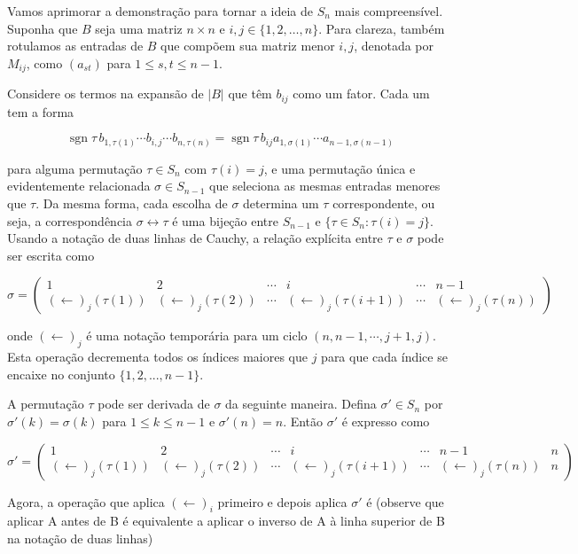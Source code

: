 Vamos aprimorar a demonstração para tornar a ideia de $S_n$ mais compreensível. Suponha que $B$ seja uma matriz $n \times n$ e $i,j \in \{1,2,\dots ,n\}$. Para clareza, também rotulamos as entradas de $B$ que compõem sua matriz menor $i,j$, denotada por $M_{ij}$, como $(a_{st})$ para $1 \leq s,t \leq n-1$.

Considere os termos na expansão de $|B|$ que têm $b_{ij}$ como um fator. Cada um tem a forma

$$\operatorname{sgn} \tau \, b_{1,\tau (1)}\cdots b_{i,j}\cdots b_{n,\tau (n)} = \operatorname{sgn} \tau \, b_{ij} a_{1,\sigma (1)}\cdots a_{n-1,\sigma (n-1)}$$

para alguma permutação $\tau \in S_n$ com $\tau (i) = j$, e uma permutação única e evidentemente relacionada $\sigma \in S_{n-1}$ que seleciona as mesmas entradas menores que $\tau$. Da mesma forma, cada escolha de $\sigma$ determina um $\tau$ correspondente, ou seja, a correspondência $\sigma \leftrightarrow \tau$ é uma bijeção entre $S_{n-1}$ e $\{\tau \in S_{n}: \tau (i) = j\}$. Usando a notação de duas linhas de Cauchy, a relação explícita entre $\tau$ e $\sigma$ pode ser escrita como

$$\sigma = \begin{pmatrix} 1 & 2 & \cdots & i & \cdots & n-1 \\ (\leftarrow )_{j}(\tau (1)) & (\leftarrow )_{j}(\tau (2)) & \cdots & (\leftarrow )_{j}(\tau (i+1)) & \cdots & (\leftarrow )_{j}(\tau (n)) \end{pmatrix}$$

onde $(\leftarrow )_{j}$ é uma notação temporária para um ciclo $(n,n-1,\cdots ,j+1,j)$. Esta operação decrementa todos os índices maiores que $j$ para que cada índice se encaixe no conjunto $\{1,2,...,n-1\}$.

A permutação $\tau$ pode ser derivada de $\sigma$ da seguinte maneira. Defina $\sigma' \in S_{n}$ por $\sigma' (k) = \sigma (k)$ para $1 \leq k \leq n-1$ e $\sigma' (n) = n$. Então $\sigma'$ é expresso como

$$\sigma' = \begin{pmatrix} 1 & 2 & \cdots & i & \cdots & n-1 & n \\ (\leftarrow )_{j}(\tau (1)) & (\leftarrow )_{j}(\tau (2)) & \cdots & (\leftarrow )_{j}(\tau (i+1)) & \cdots & (\leftarrow )_{j}(\tau (n)) & n \end{pmatrix}$$

Agora, a operação que aplica $(\leftarrow )_{i}$ primeiro e depois aplica $\sigma'$ é (observe que aplicar A antes de B é equivalente a aplicar o inverso de A à linha superior de B na notação de duas linhas)

